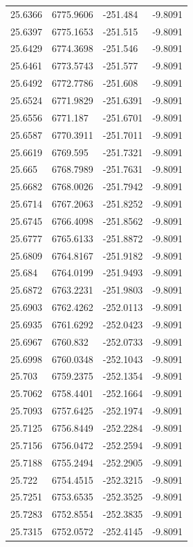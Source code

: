 \begin{table}[H]
\begin{tabular}{llll}
25.6366 & 6775.9606 & -251.484 & -9.8091 \\
25.6397 & 6775.1653 & -251.515 & -9.8091 \\
25.6429 & 6774.3698 & -251.546 & -9.8091 \\
25.6461 & 6773.5743 & -251.577 & -9.8091 \\
25.6492 & 6772.7786 & -251.608 & -9.8091 \\
25.6524 & 6771.9829 & -251.6391 & -9.8091 \\
25.6556 & 6771.187 & -251.6701 & -9.8091 \\
25.6587 & 6770.3911 & -251.7011 & -9.8091 \\
25.6619 & 6769.595 & -251.7321 & -9.8091 \\
25.665 & 6768.7989 & -251.7631 & -9.8091 \\
25.6682 & 6768.0026 & -251.7942 & -9.8091 \\
25.6714 & 6767.2063 & -251.8252 & -9.8091 \\
25.6745 & 6766.4098 & -251.8562 & -9.8091 \\
25.6777 & 6765.6133 & -251.8872 & -9.8091 \\
25.6809 & 6764.8167 & -251.9182 & -9.8091 \\
25.684 & 6764.0199 & -251.9493 & -9.8091 \\
25.6872 & 6763.2231 & -251.9803 & -9.8091 \\
25.6903 & 6762.4262 & -252.0113 & -9.8091 \\
25.6935 & 6761.6292 & -252.0423 & -9.8091 \\
25.6967 & 6760.832 & -252.0733 & -9.8091 \\
25.6998 & 6760.0348 & -252.1043 & -9.8091 \\
25.703 & 6759.2375 & -252.1354 & -9.8091 \\
25.7062 & 6758.4401 & -252.1664 & -9.8091 \\
25.7093 & 6757.6425 & -252.1974 & -9.8091 \\
25.7125 & 6756.8449 & -252.2284 & -9.8091 \\
25.7156 & 6756.0472 & -252.2594 & -9.8091 \\
25.7188 & 6755.2494 & -252.2905 & -9.8091 \\
25.722 & 6754.4515 & -252.3215 & -9.8091 \\
25.7251 & 6753.6535 & -252.3525 & -9.8091 \\
25.7283 & 6752.8554 & -252.3835 & -9.8091 \\
25.7315 & 6752.0572 & -252.4145 & -9.8091 \\

\end{tabular}
\end{table}

